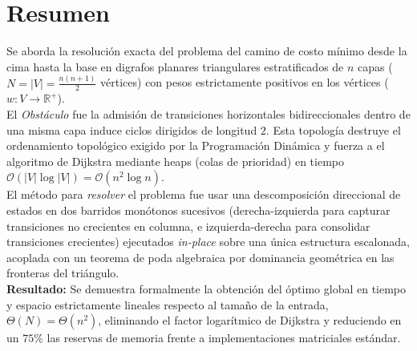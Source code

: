 \vspace*{1.5cm}
\section*{Resumen}

Se aborda la resolución exacta del problema del camino de costo mínimo desde la cima hasta la base en digrafos planares triangulares estratificados de $n$ capas ($N = |V| = \frac{n(n+1)}{2}$ vértices) con pesos estrictamente positivos en los vértices ($w: V \to \mathbb{R}^+$). \\
El \textit{Obstáculo} fue la admisión de transiciones horizontales bidireccionales dentro de una misma capa induce ciclos dirigidos de longitud $2$. Esta topología destruye el ordenamiento topológico exigido por la Programación Dinámica y fuerza a el algoritmo de Dijkstra mediante heaps (colas de prioridad) en tiempo $\mathcal{O}(|V| \log |V|) = \mathcal{O}(n^2 \log n)$. \\
El método para \textit{resolver} el problema fue usar una descomposición direccional de estados en dos barridos monótonos sucesivos (derecha-izquierda para capturar transiciones no crecientes en columna, e izquierda-derecha para consolidar transiciones crecientes) ejecutados \textit{in-place} sobre una única estructura escalonada, acoplada con un teorema de poda algebraica por dominancia geométrica en las fronteras del triángulo. \\
\textbf{Resultado:} Se demuestra formalmente la obtención del óptimo global en tiempo y espacio estrictamente lineales respecto al tamaño de la entrada, $\Theta(N) = \Theta(n^2)$, eliminando el factor logarítmico de Dijkstra y reduciendo en un $75\%$ las reservas de memoria frente a implementaciones matriciales estándar.

\vspace{1.5ex}
\vspace{7ex} %